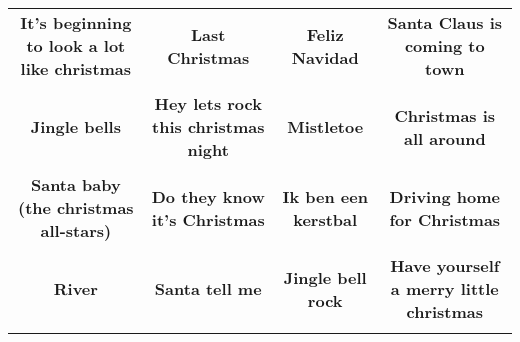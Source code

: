 \documentclass[12pt]{article} \usepackage{eso-pic, graphicx}
\newcommand{\background}[1]{%
\AddToShipoutPictureBG*{\texttt{[image: \#1]}}
}
\begin{document}
\tabcolsep=30.2pt \renewcommand{\arraystretch}{4.5}   \vspace*{4.3cm} \begin{center}  \begin{tabular}{c c c c}
\parbox{3cm}{\centering \textbf{It’s beginning to look a lot like christmas}}& 
\parbox{3cm}{\centering \textbf{Last Christmas}}& 
\parbox{3cm}{\centering \textbf{Feliz Navidad}}& 
\parbox{3cm}{\centering \textbf{Santa Claus is coming to town}}\\ \\ 
\parbox{3cm}{\centering \textbf{Jingle bells}}& 
\parbox{3cm}{\centering \textbf{Hey lets rock this christmas night}}& 
\parbox{3cm}{\centering \textbf{Mistletoe}}& 
\parbox{3cm}{\centering \textbf{Christmas is all around}}\\ \\ 
\parbox{3cm}{\centering \textbf{Santa baby (the christmas all-stars)}}& 
\parbox{3cm}{\centering \textbf{Do they know it's Christmas}}& 
\parbox{3cm}{\centering \textbf{Ik ben een kerstbal}}& 
\parbox{3cm}{\centering \textbf{Driving home for Christmas}}\\ \\ 
\parbox{3cm}{\centering \textbf{River}}& 
\parbox{3cm}{\centering \textbf{Santa tell me}}& 
\parbox{3cm}{\centering \textbf{Jingle bell rock}}& 
\parbox{3cm}{\centering \textbf{Have yourself a merry little christmas}}\\ \\ 
\end{tabular} \background{discobingo.pdf} \end{center} 
\end{document}
